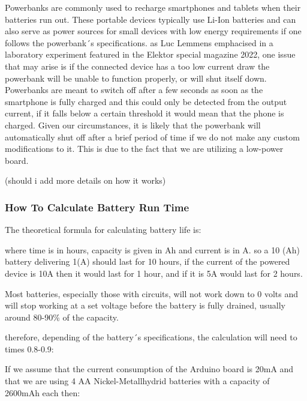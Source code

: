 Powerbanks are commonly used to recharge smartphones and tablets when their batteries run out. These portable devices typically use Li-Ion batteries and can also serve as power sources for small devices with low energy requirements if one follows the powerbank´s specifications. 
as Luc Lemmens emphacised in a laboratory experiment featured in the Elektor special magazine 2022, one issue that may arise is if the connected device has a too low current draw the powerbank will be unable to function properly, or will shut itself down.  Powerbanks are meant to switch off after a few seconds as soon as the smartphone is fully charged and this could only be detected from the output current, if it falls below a certain threshold it would mean that the phone is charged. 
Given our circumstances, it is likely that the powerbank will automatically shut off after a brief period of time if we do not make any custom modifications to it. This is due to the fact that we are utilizing a low-power board.

(should i add more details on how it works)


\subsubsection{How To Calculate Battery Run Time}


The theoretical formula for calculating battery life is: 


where time is in hours, capacity is given in Ah and current is in A. so a 10 (Ah) battery delivering 1(A) should last for 10 hours, if the current of the powered device is 10A then it would last for 1 hour, and if it is 5A would last for 2 hours. 

Most batteries, especially those with circuits, will not work down to 0 volts and will stop working at a set voltage before the battery is fully drained, usually around 80-90\% of the capacity. 

therefore, depending of the battery´s specifications, the calculation will need to times 0.8-0.9:


If we assume that the current consumption of the Arduino board is 20mA and that we are using 4 AA Nickel-Metallhydrid batteries with a capacity of 2600mAh each then: 


